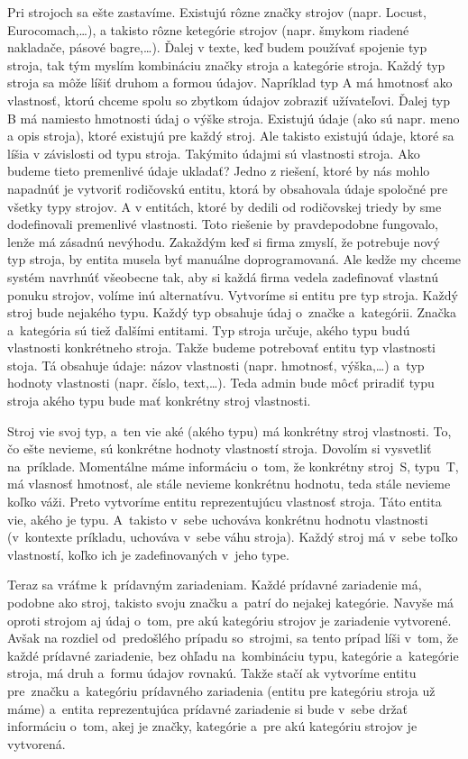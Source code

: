 Pri strojoch sa ešte zastavíme. Existujú rôzne značky strojov (napr. Locust, Eurocomach,\dots), a takisto rôzne ketegórie strojov (napr. šmykom riadené nakladače, pásové bagre,\dots). Ďalej v texte, keď budem používať spojenie typ stroja, tak tým myslím kombináciu značky stroja a kategórie stroja. Každý typ stroja sa môže líšiť druhom a formou údajov. Napríklad typ A má hmotnosť ako vlastnosť, ktorú chceme spolu so zbytkom údajov zobraziť užívateľovi. Ďalej typ B má namiesto hmotnosti údaj o výške stroja. Existujú údaje (ako sú napr. meno a opis stroja), ktoré existujú pre každý stroj. Ale takisto existujú údaje, ktoré sa líšia v závislosti od typu stroja. Takýmito údajmi sú vlastnosti stroja. Ako budeme tieto premenlivé údaje ukladať? Jedno z riešení, ktoré by nás mohlo napadnúť je vytvoriť rodičovskú entitu, ktorá by obsahovala údaje spoločné pre všetky typy strojov. A v entitách, ktoré by dedili od rodičovskej triedy by sme dodefinovali premenlivé vlastnosti. Toto riešenie by pravdepodobne fungovalo, lenže má zásadnú nevýhodu. Zakaždým keď si firma zmyslí, že potrebuje nový typ stroja, by entita musela byť manuálne doprogramovaná. Ale kedže my chceme systém navrhnúť všeobecne tak, aby si každá firma vedela zadefinovať vlastnú ponuku strojov, volíme inú alternatívu. Vytvoríme si entitu pre typ stroja. Každý stroj bude nejakého typu. Každý typ obsahuje údaj o~značke a~kategórii. Značka a~kategória sú tiež ďalšími entitami. Typ stroja určuje, akého typu budú vlastnosti konkrétneho stroja. Takže budeme potrebovať entitu typ vlastnosti stoja. Tá obsahuje údaje: názov vlastnosti (napr. hmotnosť, výška,\dots) a~typ hodnoty vlastnosti (napr. číslo, text,\dots). Teda admin bude môcť priradiť typu stroja akého typu bude mať konkrétny stroj vlastnosti.

Stroj vie svoj typ, a~ten vie aké (akého typu) má konkrétny stroj vlastnosti. To, čo ešte nevieme, sú konkrétne hodnoty vlastností stroja. Dovolím si vysvetliť na~príklade. Momentálne máme informáciu o~tom, že konkrétny stroj~S, typu~T, má vlasnosť hmotnosť, ale stále nevieme konkrétnu hodnotu, teda stále nevieme koľko váži. Preto vytvoríme entitu reprezentujúcu vlastnosť stroja. Táto entita vie, akého je typu. A~takisto v~sebe uchováva konkrétnu hodnotu vlastnosti (v~kontexte príkladu, uchováva v~sebe váhu stroja). Každý stroj má v~sebe toľko vlastností, koľko ich je zadefinovaných v~jeho type.

Teraz sa vráťme k~prídavným zariadeniam. Každé prídavné zariadenie má, podobne ako stroj, takisto svoju značku a~patrí do nejakej kategórie. Navyše má oproti strojom aj údaj o~tom, pre akú kategóriu strojov je zariadenie vytvorené. Avšak na rozdiel od~predošlého prípadu so~strojmi, sa tento prípad líši v~tom, že každé prídavné zariadenie, bez ohľadu na~kombináciu typu, kategórie a~kategórie stroja, má druh a~formu údajov rovnakú. Takže stačí ak vytvoríme entitu pre~značku a~kategóriu prídavného zariadenia (entitu pre kategóriu stroja už máme) a~entita reprezentujúca prídavné zariadenie si bude v~sebe držať informáciu o~tom, akej je značky, kategórie a~pre akú kategóriu strojov je vytvorená.

